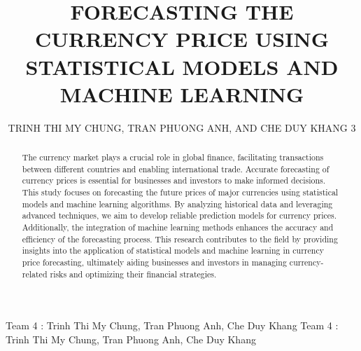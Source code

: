 \documentclass{ieeeojies}
\begin{document}
\title{FORECASTING THE CURRENCY PRICE USING STATISTICAL MODELS AND MACHINE LEARNING}

\author{\uppercase{Trinh Thi My Chung},
\uppercase{Tran Phuong Anh, and Che Duy Khang 3}}

\address[1]{Faculty of Information Systems, University of Information Technology, (e-mail: 21520653@gm.uit.edu.vn)}
\address[2]{Faculty of Information Systems, University of Information Technology, (e-mail: 21520595@gm.uit.edu.vn)}
\address[3]{Faculty of Information Systems, University of Information Technology, (e-mail: 21522187@gm.uit.edu.vn)}

\markboth
{Team 4 \headeretal: Trinh Thi My Chung, Tran Phuong Anh, Che Duy Khang}
{Team 4 \headeretal: Trinh Thi My Chung, Tran Phuong Anh, Che Duy Khang}

\begin{abstract}

The currency market plays a crucial role in global finance, facilitating transactions between different countries and enabling international trade. Accurate forecasting of currency prices is essential for businesses and investors to make informed decisions. This study focuses on forecasting the future prices of major currencies using statistical models and machine learning algorithms. By analyzing historical data and leveraging advanced techniques, we aim to develop reliable prediction models for currency prices. Additionally, the integration of machine learning methods enhances the accuracy and efficiency of the forecasting process. This research contributes to the field by providing insights into the application of statistical models and machine learning in currency price forecasting, ultimately aiding businesses and investors in managing currency-related risks and optimizing their financial strategies.
\end{abstract}

\begin{keywords}
\end{keywords}

\titlepgskip=-15pt

\maketitle
\end{document}
